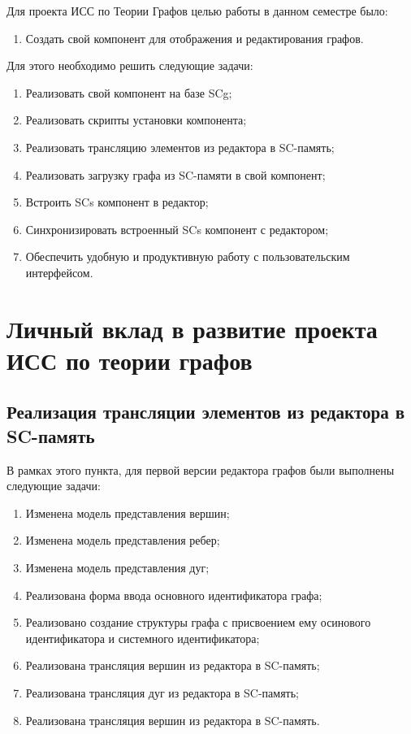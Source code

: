 Для проекта ИСС по Теории Графов целью работы в данном семестре было:
\begin{enumerate}
\item{Создать свой компонент для отображения и редактирования графов.}
\end{enumerate}

Для этого необходимо решить следующие задачи:
\begin{enumerate}
\item{Реализовать свой компонент на базе SCg;}
\item{Реализовать скрипты установки компонента;}
\item{Реализовать трансляцию элементов из редактора в SC-память;}
\item{Реализовать загрузку графа из SC-памяти в свой компонент;}
\item{Встроить SCs компонент в редактор;}
\item{Синхронизировать встроенный SCs компонент с редактором;}
\item{Обеспечить удобную и продуктивную работу с пользовательским интерфейсом.}
\end{enumerate}

\section{Личный вклад в развитие проекта ИСС по теории графов}
\label{sec:domain2}

\subsection{Реализация трансляции элементов из редактора в SC-память}

В рамках этого пункта, для первой версии редактора графов были выполнены следующие задачи:

\begin{enumerate}
\item{Изменена модель представления вершин;}
\item{Изменена модель представления ребер;}
\item{Изменена модель представления дуг;}
\item{Реализована форма ввода основного идентификатора графа;}
\item{Реализовано создание структуры графа с присвоением ему осинового идентификатора и системного идентификатора;}
\item{Реализована трансляция вершин из редактора в SC-память;}
\item{Реализована трансляция дуг из редактора в SC-память;}
\item{Реализована трансляция вершин из редактора в SC-память.}
\end{enumerate}

